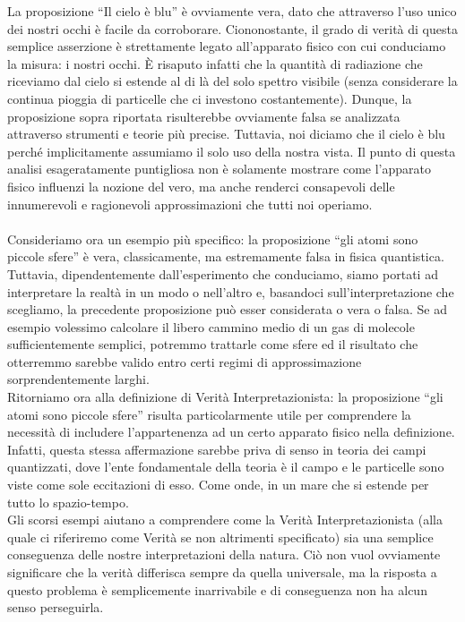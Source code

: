 \documentclass[]{article}
\begin{document}
	La proposizione \enquote{Il cielo è blu} è ovviamente vera, dato che attraverso l'uso unico dei nostri occhi è facile da corroborare. Ciononostante, il grado di verità di questa semplice asserzione è strettamente legato all'apparato fisico con cui conduciamo la misura: i nostri occhi. \`E risaputo infatti che la quantità di radiazione che riceviamo dal cielo si estende al di là del solo spettro visibile (senza considerare la continua pioggia di particelle che ci investono costantemente). Dunque, la proposizione sopra riportata risulterebbe ovviamente falsa se analizzata attraverso strumenti e teorie più precise. Tuttavia, noi diciamo che il cielo è blu perché implicitamente assumiamo il solo uso della nostra vista. Il punto di questa analisi esageratamente puntigliosa non è solamente mostrare come l'apparato fisico influenzi la nozione del vero, ma anche renderci consapevoli delle innumerevoli e ragionevoli approssimazioni che tutti noi operiamo.\\
	\\
	Consideriamo ora un esempio più specifico: la proposizione \enquote{gli atomi sono piccole sfere} è vera, classicamente, ma estremamente falsa in fisica quantistica. Tuttavia, dipendentemente dall'esperimento che conduciamo, siamo portati ad interpretare la realtà in un modo o nell'altro e, basandoci sull'interpretazione che scegliamo, la precedente proposizione può esser considerata o vera o falsa. Se ad esempio volessimo calcolare il libero cammino medio di un gas di molecole sufficientemente semplici, potremmo trattarle come sfere ed il risultato che otterremmo sarebbe valido entro certi regimi di approssimazione sorprendentemente larghi.\\
	Ritorniamo ora alla definizione di Verità Interpretazionista: la proposizione \enquote{gli atomi sono piccole sfere} risulta particolarmente utile per comprendere la necessità di includere l'appartenenza ad un certo apparato fisico nella definizione. Infatti, questa stessa affermazione sarebbe priva di senso in teoria dei campi quantizzati, dove l'ente fondamentale della teoria è il campo e le particelle sono viste come sole eccitazioni di esso. Come onde, in un mare che si estende per tutto lo spazio-tempo.\\
	Gli scorsi esempi aiutano a comprendere come la Verità Interpretazionista (alla quale ci riferiremo come Verità se non altrimenti specificato) sia una semplice conseguenza delle nostre interpretazioni della natura. Ciò non vuol ovviamente significare che la verità differisca sempre da quella universale, ma la risposta a questo problema è semplicemente inarrivabile e di conseguenza non ha alcun senso perseguirla.\\
\end{document}

